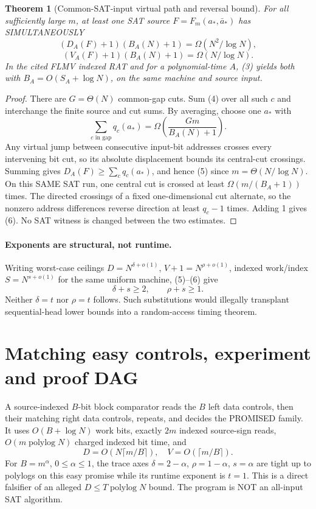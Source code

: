 \documentclass[11pt]{article}
\newtheorem{theorem}{Theorem}
\begin{document}
\begin{theorem}[Common-SAT-input virtual path and reversal bound]\label{th:joint}
For all sufficiently large $m$, at least one SAT source $F=F_m(a_*,\bar a_*)$ has SIMULTANEOUSLY
\[
 \boxed{(D_A(F)+1)(B_A(N)+1)=\Omega(N^2/\log N),} \tag{5}
\]
\[
 \boxed{(V_A(F)+1)(B_A(N)+1)=\Omega(N/\log N).} \tag{6}
\]
In the cited FLMV indexed RAT and for a polynomial-time $A$, (3) yields both with $B_A=O(S_A+\log N)$, on the same machine and source input.
\end{theorem}
\begin{proof}
There are $G=\Theta(N)$ common-gap cuts. Sum (4) over all such $c$ and interchange the finite source and cut sums. By averaging, choose one $a_*$ with
\[
 \sum_{c\text{ in gap}}q_c(a_*)=
 \Omega\!\left(\frac{Gm}{B_A(N)+1}\right).
\]
Any virtual jump between consecutive input-bit addresses crosses every intervening bit cut, so its absolute displacement bounds its central-cut crossings. Summing gives $D_A(F)\ge\sum_cq_c(a_*)$, and hence (5) since $m=\Theta(N/\log N)$. On this SAME SAT run, one central cut is crossed at least $\Omega(m/(B_A+1))$ times. The directed crossings of a fixed one-dimensional cut alternate, so the nonzero address differences reverse direction at least $q_c-1$ times. Adding 1 gives (6). No SAT witness is changed between the two estimates.
\end{proof}

\paragraph{Exponents are structural, not runtime.}
Writing worst-case ceilings $D=N^{\delta+o(1)}$, $V+1=N^{\rho+o(1)}$, indexed work/index $S=N^{s+o(1)}$ for the same uniform machine, (5)--(6) give
\[
  \delta+s\ge2,\qquad \rho+s\ge1. \tag{7}
\]
Neither $\delta=t$ nor $\rho=t$ follows. Such substitutions would illegally transplant sequential-head lower bounds into a random-access timing theorem.

\section{Matching easy controls, experiment and proof DAG}
A source-indexed $B$-bit block comparator reads the $B$ left data controls, then their matching right data controls, repeats, and decides the PROMISED family. It uses $O(B+\log N)$ work bits, exactly $2m$ indexed source-sign reads, $O(m\operatorname{polylog}N)$ charged indexed bit time, and
\[
 D=O(N\lceil m/B\rceil),\quad V=O(\lceil m/B\rceil).
\]
For $B=m^\alpha$, $0\le\alpha\le1$, the trace axes $\delta=2-\alpha$, $\rho=1-\alpha$, $s=\alpha$ are tight up to polylogs on this easy promise while its runtime exponent is $t=1$. This is a direct falsifier of an alleged $D\le T\operatorname{polylog}N$ bound. The program is NOT an all-input SAT algorithm.
\end{document}

